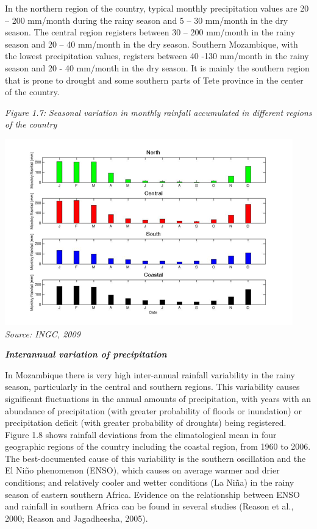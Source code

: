 \documentclass[
]{book}
\begin{document}
In the northern region of the country, typical monthly precipitation values are 20 -- 200 mm/month during the rainy season and 5 -- 30 mm/month in the dry season. The central region registers between 30 -- 200 mm/month in the rainy season and 20 -- 40 mm/month in the dry season. Southern Mozambique, with the lowest precipitation values, registers between 40 -130 mm/month in the rainy season and 20 - 40 mm/month in the dry season. It is mainly the southern region that is prone to drought and some southern parts of Tete province in the center of the country.

\emph{Figure 1.7: Seasonal variation in monthly rainfall accumulated in different regions of the country}

\includegraphics{Figure13.png}
\emph{Source: INGC, 2009}

\textbf{\emph{Interannual variation of precipitation}}

In Mozambique there is very high inter-annual rainfall variability in the rainy season, particularly in the central and southern regions. This variability causes significant fluctuations in the annual amounts of precipitation, with years with an abundance of precipitation (with greater probability of floods or inundation) or precipitation deficit (with greater probability of droughts) being registered. Figure 1.8 shows rainfall deviations from the climatological mean in four geographic regions of the country including the coastal region, from 1960 to 2006. The best-documented cause of this variability is the southern oscillation and the El Niño phenomenon (ENSO), which causes on average warmer and drier conditions; and relatively cooler and wetter conditions (La Niña) in the rainy season of eastern southern Africa. Evidence on the relationship between ENSO and rainfall in southern Africa can be found in several studies (Reason et al., 2000; Reason and Jagadheesha, 2005).
\end{document}
